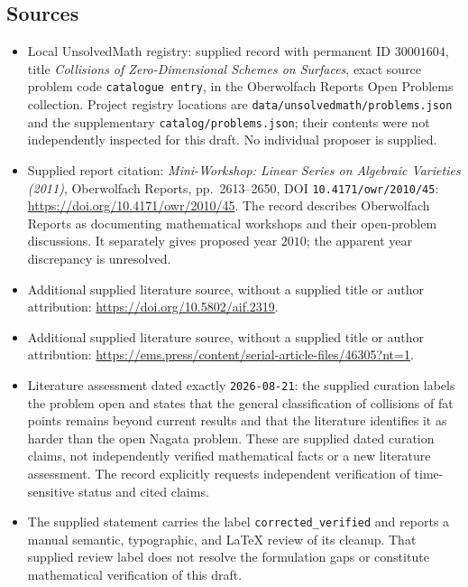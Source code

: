 \documentclass[11pt]{article}
\begin{document}
\subsection{Sources}
\begin{itemize}
\item Local UnsolvedMath registry: supplied record with permanent ID \(30001604\), title \emph{Collisions of Zero-Dimensional Schemes on Surfaces}, exact source problem code \texttt{catalogue entry}, in the Oberwolfach Reports Open Problems collection. Project registry locations are \texttt{data/unsolvedmath/problems.json} and the supplementary \texttt{catalog/problems.json}; their contents were not independently inspected for this draft. No individual proposer is supplied.
\item Supplied report citation: \emph{Mini-Workshop: Linear Series on Algebraic Varieties (2011)}, Oberwolfach Reports, pp.\ 2613--2650, DOI \texttt{10.4171/owr/2010/45}: \url{https://doi.org/10.4171/owr/2010/45}. The record describes Oberwolfach Reports as documenting mathematical workshops and their open-problem discussions. It separately gives proposed year \(2010\); the apparent year discrepancy is unresolved.
\item Additional supplied literature source, without a supplied title or author attribution: \url{https://doi.org/10.5802/aif.2319}.
\item Additional supplied literature source, without a supplied title or author attribution: \url{https://ems.press/content/serial-article-files/46305?nt=1}.
\item Literature assessment dated exactly \texttt{2026-08-21}: the supplied curation labels the problem open and states that the general classification of collisions of fat points remains beyond current results and that the literature identifies it as harder than the open Nagata problem. These are supplied dated curation claims, not independently verified mathematical facts or a new literature assessment. The record explicitly requests independent verification of time-sensitive status and cited claims.
\item The supplied statement carries the label \texttt{corrected\_verified} and reports a manual semantic, typographic, and LaTeX review of its cleanup. That supplied review label does not resolve the formulation gaps or constitute mathematical verification of this draft.
\end{itemize}
\end{document}
